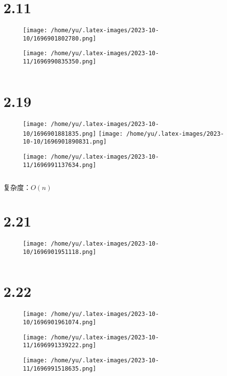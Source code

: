 \documentclass[14pt]{extarticle}
\begin{document}
\vspace*{0pt}
\section{2.11}

\begin{figure}[H]
    \centering
    \texttt{[image: /home/yu/.latex-images/2023-10-10/1696901802780.png]}
\end{figure}
\begin{figure}[H]
    \centering
    \texttt{[image: /home/yu/.latex-images/2023-10-11/1696990835350.png]}
\end{figure}

\inputminted{cpp}{2.11.cpp}



\section{2.19}

\begin{figure}[H]
    \centering
    \texttt{[image: /home/yu/.latex-images/2023-10-10/1696901881835.png]}
    \texttt{[image: /home/yu/.latex-images/2023-10-10/1696901890831.png]}
\end{figure}
\begin{figure}[H]
    \centering
    \texttt{[image: /home/yu/.latex-images/2023-10-11/1696991137634.png]}
\end{figure}


\inputminted{cpp}{2.19.cpp}

复杂度：$O(n)$


\section{2.21}
\begin{figure}[H]
    \centering
    \texttt{[image: /home/yu/.latex-images/2023-10-10/1696901951118.png]}
\end{figure}


\inputminted{cpp}{2.21.cpp}


\section{2.22}
\begin{figure}[H]
    \centering
    \texttt{[image: /home/yu/.latex-images/2023-10-10/1696901961074.png]}
\end{figure}
\begin{figure}[H]
    \centering
    \texttt{[image: /home/yu/.latex-images/2023-10-11/1696991339222.png]}
\end{figure}
\begin{figure}[H]
    \centering
    \texttt{[image: /home/yu/.latex-images/2023-10-11/1696991518635.png]}
\end{figure}
\end{document}
